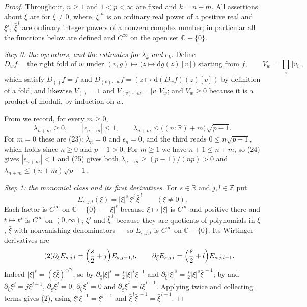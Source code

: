 \begin{proof}
Throughout, $n\ge1$ and $1<p<\infty$ are fixed and $k=n+m$.  All assertions
about $\xi$ are for $\xi\ne0$, where $|\xi|^{a}$ is an ordinary real power of
a positive real and $\xi^{j}$, $\bar\xi^{\,l}$ are ordinary integer powers of a
nonzero complex number; in particular all the functions below are defined and
$C^\infty$ on the open set $\mathbb{C}-\{0\}$.

\emph{Step 0: the operators, and the estimates for $\lambda_k$ and
$\epsilon_k$.}  Define
\[
  D_wf=\text{the right fold of }w\text{ under }(v,g)\mapsto
    \bigl(z\mapsto\mathrm{d}g(z)[v]\bigr)\text{ starting from }f,
  \qquad V_w=\prod_{i}|v_i| ,
\]
which satisfy $D_{()}f=f$ and $D_{(v)\frown w}f=(z\mapsto\mathrm{d}(D_wf)(z)[v])$
by definition of a fold, and likewise $V_{()}=1$ and
$V_{(v)\frown w}=|v|\,V_w$; and $V_w\ge0$ because it is a product of moduli,
by induction on $w$.

From  we record, for every $m\ge0$,
\begin{equation}\tag{1}
  \lambda_{n+m}\ge0,\qquad
  |\epsilon_{n+m}|\le1,\qquad
  \lambda_{n+m}\le\bigl((n:\mathbb{R})+m\bigr)\sqrt{p-1}.
\end{equation}
For $m=0$ these are (23): $\lambda_n=0$ and $\epsilon_n=0$, and the third
reads $0\le n\sqrt{p-1}$, which holds since $n\ge0$ and $p-1>0$.  For $m\ge1$
we have $n+1\le n+m$, so (24) gives $|\epsilon_{n+m}|<1$ and (25) gives both
$\lambda_{n+m}\ge(p-1)/(np)>0$ and $\lambda_{n+m}\le(n+m)\sqrt{p-1}$.

\emph{Step 1: the monomial class and its first derivatives.}  For $s\in
\mathbb{R}$ and $j,l\in\mathbb{Z}$ put
\[
  E_{s,j,l}(\xi)=|\xi|^{s}\,\xi^{j}\,\bar\xi^{\,l}\qquad(\xi\ne0).
\]
Each factor is $C^\infty$ on $\mathbb{C}-\{0\}$ --- $|\xi|^{s}$ because
$\xi\mapsto|\xi|$ is $C^\infty$ and positive there and $t\mapsto t^{s}$ is
$C^\infty$ on $(0,\infty)$; $\xi^{j}$ and $\bar\xi^{\,l}$ because they are
quotients of polynomials in $\xi$, $\bar\xi$ with nonvanishing denominators
--- so $E_{s,j,l}$ is $C^\infty$ on $\mathbb{C}-\{0\}$.  Its Wirtinger
derivatives are
\begin{equation}\tag{2}
  \partial_\xi E_{s,j,l}=\Bigl(\frac{s}{2}+j\Bigr)E_{s,j-1,l},
  \qquad
  \partial_{\bar\xi}E_{s,j,l}=\Bigl(\frac{s}{2}+l\Bigr)E_{s,j,l-1} .
\end{equation}
Indeed $|\xi|^{s}=(\xi\bar\xi)^{s/2}$, so by
$\partial_\xi|\xi|^{s}=\tfrac{s}{2}|\xi|^{s}\xi^{-1}$ and
$\partial_{\bar\xi}|\xi|^{s}=\tfrac{s}{2}|\xi|^{s}\bar\xi^{\,-1}$; by
 and 
$\partial_\xi\xi^{j}=j\xi^{j-1}$, $\partial_{\bar\xi}\xi^{j}=0$,
$\partial_\xi\bar\xi^{\,l}=0$ and
$\partial_{\bar\xi}\bar\xi^{\,l}=l\bar\xi^{\,l-1}$.  Applying
 twice and collecting terms gives (2), using
$\xi^{j}\xi^{-1}=\xi^{j-1}$ and $\bar\xi^{\,l}\bar\xi^{\,-1}=\bar\xi^{\,l-1}$.


\end{proof}
